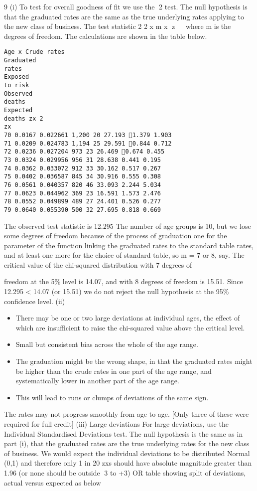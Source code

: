 \documentclass[a4paper,12pt]{article}
\begin{document}
9 (i) To test for overall goodness of fit we use the 2 test.
The null hypothesis is that the graduated rates are the same as the true
underlying rates applying to the new class of business.
The test statistic 2 2
x m
x
z   where m is the degrees of freedom.
The calculations are shown in the table below.
\begin{verbatim}
Age x Crude rates
Graduated
rates
Exposed
to risk
Observed
deaths
Expected
deaths zx 2
zx
70 0.0167 0.022661 1,200 20 27.193 1.379 1.903
71 0.0209 0.024783 1,194 25 29.591 0.844 0.712
72 0.0236 0.027204 973 23 26.469 0.674 0.455
73 0.0324 0.029956 956 31 28.638 0.441 0.195
74 0.0362 0.033072 912 33 30.162 0.517 0.267
75 0.0402 0.036587 845 34 30.916 0.555 0.308
76 0.0561 0.040357 820 46 33.093 2.244 5.034
77 0.0623 0.044962 369 23 16.591 1.573 2.476
78 0.0552 0.049899 489 27 24.401 0.526 0.277
79 0.0640 0.055390 500 32 27.695 0.818 0.669
\end{verbatim}
The observed test statistic is 12.295
The number of age groups is 10, but we lose some degrees of freedom
because of the process of graduation
one for the parameter of the function linking the graduated rates to the
standard table rates, and at least one more for the choice of standard table, so
m = 7 or 8, say.
The critical value of the chi-squared distribution with 7 degrees of

freedom at the 5\% level is 14.07, and with 8 degrees of freedom is 15.51.
Since 12.295 < 14.07 (or 15.51)
we do not reject the null hypothesis at the 95\% confidence level. 
(ii) 
\begin{itemize}
    \item There may be one or two large deviations at individual ages, the effect of
which are insufficient to raise the chi-squared value above the critical level.
\item Small but consistent bias across the whole of the age range.
\item The graduation might be the wrong shape, in that the graduated rates might be
higher than the crude rates in one part of the age range, and systematically
lower in another part of the age range.
\item This will lead to runs or clumps of
deviations of the same sign.
\end{itemize}
The rates may not progress smoothly from age to age.
[Only three of these were required for full credit] 
(iii) Large deviations
For large deviations, use the Individual Standardised Deviations test.
The null hypothesis is the same as in part (i), that the graduated rates are the
true underlying rates for the new class of business.
We would expect the individual deviations to be distributed Normal (0,1)
and therefore only 1 in 20 zxs should have absolute magnitude greater than
1.96 (or none should be outside 3 to +3)
OR table showing split of deviations, actual versus expected
as below
\end{document}
